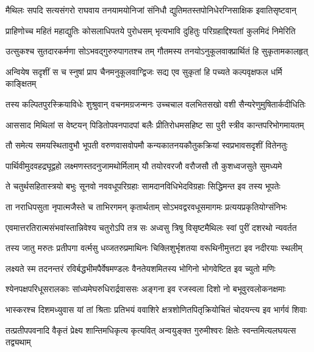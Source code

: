 \twolineshloka
{मैथिलः सपदि सत्यसंगरो राघवाय तनयामयोनिजां}
{संनिधौ द्युतिमतस्तपोनिधेरग्निसाक्षिक इवातिसृष्टवान्}%

\twolineshloka
{प्राहिणोच्च महितं महाद्युतिः कोसलाधिपतये पुरोधसम्}
{भृत्यभावि दुहितुः परिग्रहाद्दिश्यतां कुलमिदं निमेरिति}%

\twolineshloka
{उत्सुकश्च सुतदारकर्मणा सोऽभवद्गुरुरुपागतश्च तम्}
{गौतमस्य तनयोऽनुकूलवाक्प्रार्थितं हि सुकृतामकालहृत्}%

\twolineshloka
{अन्वियेष सदृशीं स च स्नुषां प्राप चैनमनुकूलवाग्द्विजः}
{सद्य एव सुकृतां हि पच्यते कल्पवृक्षफल धर्मि काङ्क्षितम्}%

\twolineshloka
{तस्य कल्पितपुरस्क्रियाविधेः शुश्रुवान् वचनमग्रजन्मनः}
{उच्चचाल वलभितसखो वशी सैन्यरेणुमुषितार्कदीधितिः}%

\twolineshloka
{आससाद मिथिलां स वेष्टयन् पिडितोपवनपादपां बलैः}
{प्रीतिरोधमसहिष्ट सा पुरी स्त्रीव कान्तपरिभोगमायतम्}%

\twolineshloka
{तौ समेत्य समयस्थितावुभौ भूपती वरुणवासवोपमौ}
{कन्यकातनयकौतुकक्रियां स्वप्रभावसदृशीं वितेनतुः}%

\twolineshloka
{पार्थिवीमुदवहद्रघूद्वहो लक्ष्मणस्तदनुजामथोर्मिलाम्}
{यौ तयोरवरजौ वरौजसौ तौ कुशध्वजसुते सुमध्यमे}%

\twolineshloka
{ते चतुर्थसहितास्त्रयो बभुः सूनवो नववधूपरिग्रहाः}
{सामदानविधिभेदविग्रहाः सिद्धिमन्त इव तस्य भूपतेः}%

\twolineshloka
{ता नराधिपसुता नृपात्मजैस्ते च ताभिरगमन् कृतार्थताम्}
{सोऽभवद्वरवधूसमागमः प्रत्ययप्रकृतियोग्संनिभः}%

\twolineshloka
{एवमात्तरतिरात्मसंभवांस्तान्निवेश्य चतुरोऽपि तत्र सः}
{अध्वसु त्रिषु विसृष्टमैथिलः स्वां पुरीं दशरथो न्यवर्तत}%

\twolineshloka
{तस्य जातु मरुतः प्रतीपगा वर्त्मसु धव्जतरुप्रमाथिनः}
{चिक्लिशुर्भृशतया वरूथिनीमुत्तटा इव नदीरयाः स्थलीम्}%

\twolineshloka
{लक्ष्यते स्म तदनन्तरं रविर्बद्धभीमपैर्वेषमण्डलः}
{वैनतेयशमितस्य भोगिनो भोगवेष्टित इव च्युतो मणिः}%

\twolineshloka
{श्येनपक्षपरिधूसरालकाः सांध्यमेघरुधिरार्द्रवाससः}
{अङ्गना इव रजस्वला दिशो नो बभूवुरवलोकनक्षमाः}%

\twolineshloka
{भास्करश्च दिशमध्युवास यां तां श्रिताः प्रतिभयं ववाशिरे}
{क्षत्रशोणितपितृक्रियोचितं चोदयन्त्य इव भार्गवं शिवाः}%

\twolineshloka
{तत्प्रतीपपवनादि वैकृतं प्रेक्ष्य शान्तिमधिकृत्य कृत्यवित्}
{अन्वयुङ्क्त गुरुमीश्वरः क्षितेः स्वन्तमित्यलघयत्स तद्व्यथाम्}%

